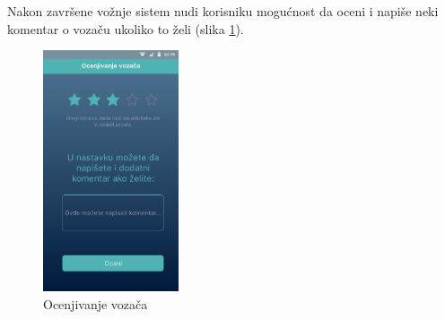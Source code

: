 Nakon završene vožnje sistem nudi korisniku mogućnost da oceni i napiše neki komentar o vozaču ukoliko to želi (slika \ref{fig:Ocenjivanje vozaca}).

\begin{figure}[h!]
\begin{center}
\includegraphics[width=4cm]{Slike/ocenjivanje_vozaca.png}
\end{center}
    \caption{Ocenjivanje vozača}
\label{fig:Ocenjivanje vozaca}
\end{figure}













